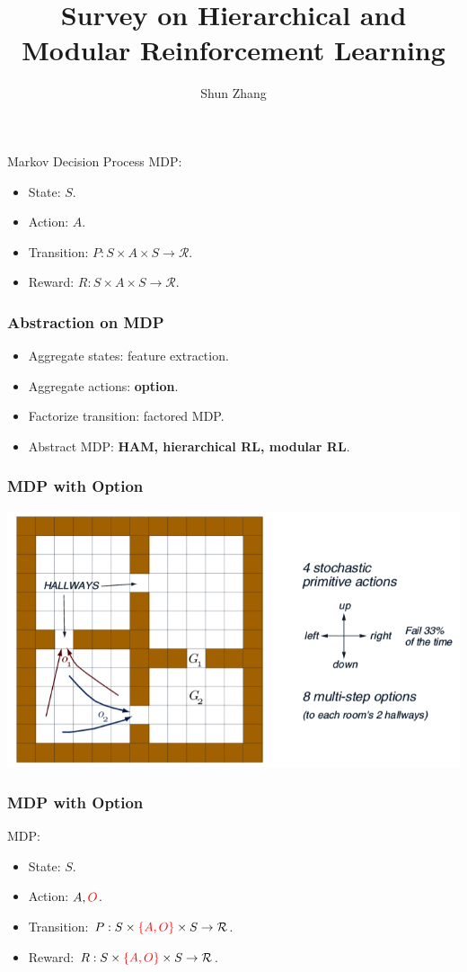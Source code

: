 \documentclass{beamer}
\title{Survey on Hierarchical and Modular Reinforcement Learning}
\author{Shun Zhang}
\begin{document}
\begin{frame}
\titlepage
\end{frame}

\begin{frame}{Markov Decision Process}
MDP:
\begin{itemize}
\item State: $S$.
\item Action: $A$.
\item Transition: $P: S \times A \times S \rightarrow \mathcal{R}$.
\item Reward: $R: S \times A \times S \rightarrow \mathcal{R}$.
\end{itemize}
\end{frame}

\begin{frame}
\frametitle{Abstraction on MDP}
\begin{itemize}
  \item Aggregate states: feature extraction.
  \item Aggregate actions: {\bf option}.
  \item Factorize transition: factored MDP.
  \item Abstract MDP: {\bf HAM, hierarchical RL, modular RL}.
\end{itemize}
\end{frame}

\begin{frame}
\frametitle{MDP with Option}
\includegraphics[width=0.8\columnwidth]{option.png}
\end{frame}

\begin{frame}
\frametitle{MDP with Option}
MDP:
\begin{itemize}
  \item State: $S$.
  \item Action: $A, {\color{red}O}$.
  \item Transition: $P: S \times {\color{red}\{A, O\}} \times S \rightarrow \mathcal{R}$.
  \item Reward: $R: S \times {\color{red}\{A, O\}} \times S \rightarrow \mathcal{R}$.
\end{itemize}
\end{frame}
\end{document}

